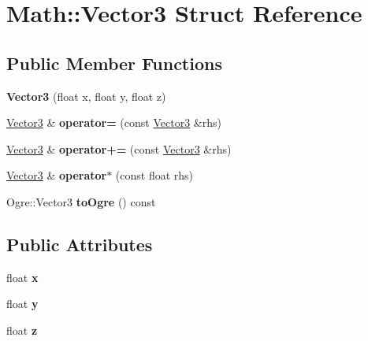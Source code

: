 \hypertarget{struct_math_1_1_vector3}{\section{Math\-:\-:Vector3 Struct Reference}
\label{struct_math_1_1_vector3}
}
\subsection*{Public Member Functions}
\begin{DoxyCompactItemize}
\item 
\hypertarget{struct_math_1_1_vector3_ac7620e32edb2e7c4c0723b9721ffc23a}{{\bfseries Vector3} (float x, float y, float z)}\label{struct_math_1_1_vector3_ac7620e32edb2e7c4c0723b9721ffc23a}

\item 
\hypertarget{struct_math_1_1_vector3_afbfdb69cef54e84d72d05c3c141e315f}{\hyperlink{struct_math_1_1_vector3}{Vector3} \& {\bfseries operator=} (const \hyperlink{struct_math_1_1_vector3}{Vector3} \&rhs)}\label{struct_math_1_1_vector3_afbfdb69cef54e84d72d05c3c141e315f}

\item 
\hypertarget{struct_math_1_1_vector3_a339c80afd026abb2e35a4ae88301928b}{\hyperlink{struct_math_1_1_vector3}{Vector3} \& {\bfseries operator+=} (const \hyperlink{struct_math_1_1_vector3}{Vector3} \&rhs)}\label{struct_math_1_1_vector3_a339c80afd026abb2e35a4ae88301928b}

\item 
\hypertarget{struct_math_1_1_vector3_a11647e19301236797d60d705e7ce3fda}{\hyperlink{struct_math_1_1_vector3}{Vector3} \& {\bfseries operator$\ast$} (const float rhs)}\label{struct_math_1_1_vector3_a11647e19301236797d60d705e7ce3fda}

\item 
\hypertarget{struct_math_1_1_vector3_af68bf47c957410d436e53de3e6633fbd}{Ogre\-::\-Vector3 {\bfseries to\-Ogre} () const }\label{struct_math_1_1_vector3_af68bf47c957410d436e53de3e6633fbd}

\end{DoxyCompactItemize}
\subsection*{Public Attributes}
\begin{DoxyCompactItemize}
\item 
\hypertarget{struct_math_1_1_vector3_a878843e917c48787b4e1fcffa8b4da3b}{float {\bfseries x}}\label{struct_math_1_1_vector3_a878843e917c48787b4e1fcffa8b4da3b}

\item 
\hypertarget{struct_math_1_1_vector3_a5d4c7c63b32834eb022f57965a1035f2}{float {\bfseries y}}\label{struct_math_1_1_vector3_a5d4c7c63b32834eb022f57965a1035f2}

\item 
\hypertarget{struct_math_1_1_vector3_a425203878d04e4e15de18527a4d3cd0f}{float {\bfseries z}}\label{struct_math_1_1_vector3_a425203878d04e4e15de18527a4d3cd0f}

\end{DoxyCompactItemize}



